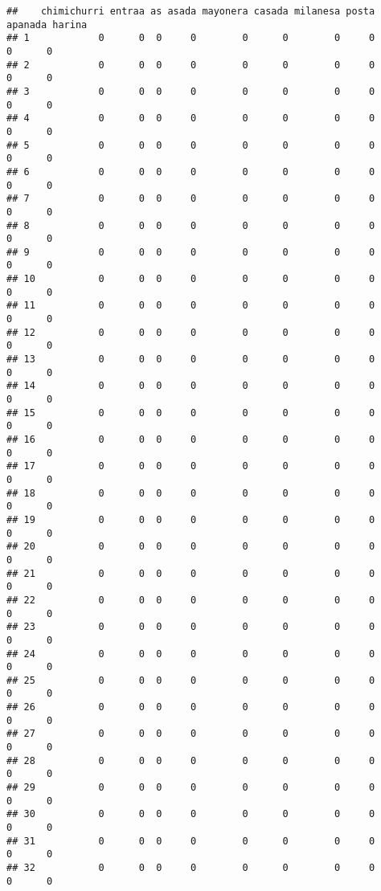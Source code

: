 \documentclass[
]{article}
\begin{document}
\begin{verbatim}
##    chimichurri entraa as asada mayonera casada milanesa posta apanada harina
## 1            0      0  0     0        0      0        0     0       0      0
## 2            0      0  0     0        0      0        0     0       0      0
## 3            0      0  0     0        0      0        0     0       0      0
## 4            0      0  0     0        0      0        0     0       0      0
## 5            0      0  0     0        0      0        0     0       0      0
## 6            0      0  0     0        0      0        0     0       0      0
## 7            0      0  0     0        0      0        0     0       0      0
## 8            0      0  0     0        0      0        0     0       0      0
## 9            0      0  0     0        0      0        0     0       0      0
## 10           0      0  0     0        0      0        0     0       0      0
## 11           0      0  0     0        0      0        0     0       0      0
## 12           0      0  0     0        0      0        0     0       0      0
## 13           0      0  0     0        0      0        0     0       0      0
## 14           0      0  0     0        0      0        0     0       0      0
## 15           0      0  0     0        0      0        0     0       0      0
## 16           0      0  0     0        0      0        0     0       0      0
## 17           0      0  0     0        0      0        0     0       0      0
## 18           0      0  0     0        0      0        0     0       0      0
## 19           0      0  0     0        0      0        0     0       0      0
## 20           0      0  0     0        0      0        0     0       0      0
## 21           0      0  0     0        0      0        0     0       0      0
## 22           0      0  0     0        0      0        0     0       0      0
## 23           0      0  0     0        0      0        0     0       0      0
## 24           0      0  0     0        0      0        0     0       0      0
## 25           0      0  0     0        0      0        0     0       0      0
## 26           0      0  0     0        0      0        0     0       0      0
## 27           0      0  0     0        0      0        0     0       0      0
## 28           0      0  0     0        0      0        0     0       0      0
## 29           0      0  0     0        0      0        0     0       0      0
## 30           0      0  0     0        0      0        0     0       0      0
## 31           0      0  0     0        0      0        0     0       0      0
## 32           0      0  0     0        0      0        0     0       0      0

\end{verbatim}
\end{document}
